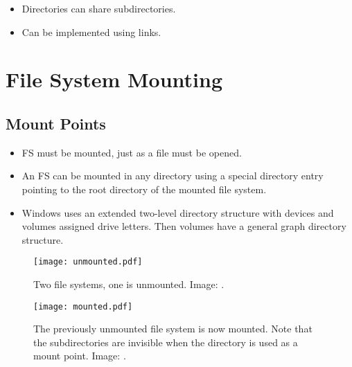 \documentclass{beamer}
\begin{document}
\begin{frame}{\insertsubsectionhead}
  \begin{itemize}
    \item Directories can share subdirectories.
    \item Can be implemented using links.
  \end{itemize}
\end{frame}


\section{File System Mounting}

\subsection{Mount Points}

\begin{frame}{\insertsubsectionhead}
  \begin{itemize}
    \item FS must be mounted, just as a file must be opened.

    \item An FS can be mounted in any directory using a special directory entry 
      pointing to the root directory of the mounted file system.

    \item Windows uses an extended two-level directory structure with devices 
      and volumes assigned drive letters.
      Then volumes have a general graph directory structure.
  \end{itemize}
\end{frame}

\begin{frame}{\insertsubsectionhead}
  \begin{figure}
    \texttt{[image: unmounted.pdf]}
    \caption{Two file systems, one is unmounted.
      Image: \cite{Silberschatz2013osc}.}
  \end{figure}
\end{frame}

\begin{frame}{\insertsubsectionhead}
  \begin{figure}
    \texttt{[image: mounted.pdf]}
    \caption{The previously unmounted file system is now mounted.
      Note that the subdirectories are invisible when the directory is used as 
      a mount point.
      Image: \cite{Silberschatz2013osc}.}
  \end{figure}
\end{frame}
\end{document}
